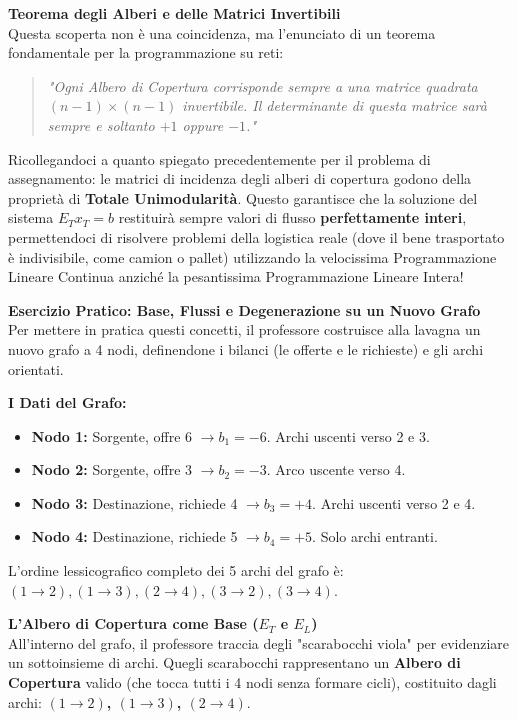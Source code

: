 \documentclass[12pt, a4paper]{article}
\newcommand{\separatore}{\noindent{\color{titlecolor!50}\rule{\textwidth}{0.6pt}}}
\begin{document}
	\vspace{0.4cm}
	\textbf{Teorema degli Alberi e delle Matrici Invertibili}\\
	Questa scoperta non è una coincidenza, ma l'enunciato di un teorema fondamentale per la programmazione su reti:
	\begin{quote}
		\textit{"Ogni Albero di Copertura corrisponde sempre a una matrice quadrata $(n-1) \times (n-1)$ invertibile. Il determinante di questa matrice sarà sempre e soltanto $+1$ oppure $-1$."}
	\end{quote}
	Ricollegandoci a quanto spiegato precedentemente per il problema di assegnamento: le matrici di incidenza degli alberi di copertura godono della proprietà di \textbf{Totale Unimodularità}. Questo garantisce che la soluzione del sistema $E_T x_T = b$ restituirà sempre valori di flusso \textbf{perfettamente interi}, permettendoci di risolvere problemi della logistica reale (dove il bene trasportato è indivisibile, come camion o pallet) utilizzando la velocissima Programmazione Lineare Continua anziché la pesantissima Programmazione Lineare Intera!
	
	\vspace{0.6cm}
	\separatore
	\vspace{0.4cm}
	
	\textbf{Esercizio Pratico: Base, Flussi e Degenerazione su un Nuovo Grafo}\\
	Per mettere in pratica questi concetti, il professore costruisce alla lavagna un nuovo grafo a 4 nodi, definendone i bilanci (le offerte e le richieste) e gli archi orientati.
	
	\textbf{I Dati del Grafo:}
	\begin{itemize}[label=$\circ$, itemsep=2pt, leftmargin=1.5cm]
		\item \textbf{Nodo 1:} Sorgente, offre 6 $\rightarrow b_1 = -6$. Archi uscenti verso 2 e 3.
		\item \textbf{Nodo 2:} Sorgente, offre 3 $\rightarrow b_2 = -3$. Arco uscente verso 4.
		\item \textbf{Nodo 3:} Destinazione, richiede 4 $\rightarrow b_3 = +4$. Archi uscenti verso 2 e 4.
		\item \textbf{Nodo 4:} Destinazione, richiede 5 $\rightarrow b_4 = +5$. Solo archi entranti.
	\end{itemize}
	L'ordine lessicografico completo dei 5 archi del grafo è: $(1\to2), (1\to3), (2\to4), (3\to2), (3\to4)$.
	
	\vspace{0.4cm}
	\textbf{L'Albero di Copertura come Base ($E_T$ e $E_L$)}\\
	All'interno del grafo, il professore traccia degli "scarabocchi viola" per evidenziare un sottoinsieme di archi. Quegli scarabocchi rappresentano un \textbf{Albero di Copertura} valido (che tocca tutti i 4 nodi senza formare cicli), costituito dagli archi: \textbf{$(1\to2)$, $(1\to3)$, $(2\to4)$}.
	
\end{document}
